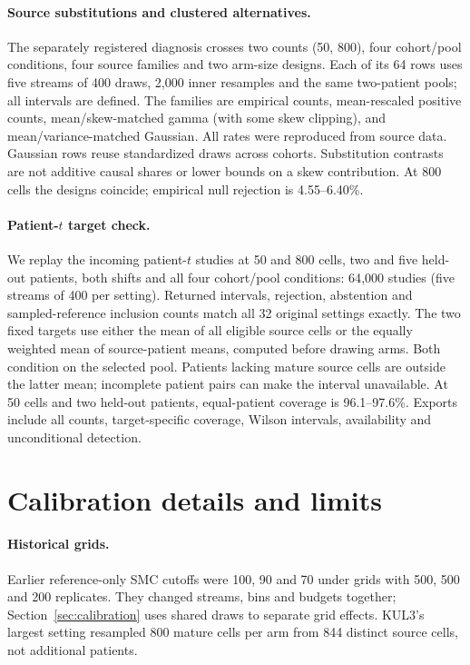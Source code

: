 \paragraph{Source substitutions and clustered alternatives.}\label{app:substitution}
The separately registered diagnosis crosses two counts (50, 800), four
cohort/pool conditions, four source families and two arm-size designs.
Each of its 64 rows uses five streams of 400 draws, 2{,}000 inner resamples
and the same two-patient pools; all intervals are defined. The families are
empirical counts, mean-rescaled positive counts, mean/skew-matched gamma
(with some skew clipping), and mean/variance-matched Gaussian. All rates
were reproduced from source data. Gaussian rows reuse standardized draws
across cohorts. Substitution contrasts are not additive causal shares or
lower bounds on a skew contribution. At 800 cells the designs coincide;
empirical null rejection is 4.55--6.40\%.

\paragraph{Patient-$t$ target check.}\label{app:patienttarget}
We replay the incoming patient-$t$ studies at 50 and 800 cells, two and five
held-out patients, both shifts and all four cohort/pool conditions: 64{,}000
studies (five streams of 400 per setting). Returned intervals, rejection,
abstention and sampled-reference inclusion counts match all 32 original
settings exactly. The two fixed targets use either the mean of all eligible
source cells or the equally weighted mean of source-patient means, computed
before drawing arms. Both condition on the selected pool. Patients lacking
mature source cells are outside the latter mean; incomplete patient pairs
can make the interval unavailable. At 50 cells and two held-out patients,
equal-patient coverage is 96.1--97.6\%. Exports include all counts, target-specific
coverage, Wilson intervals, availability and unconditional detection.

\section{Calibration details and limits}
\label{app:gridcaveats}

\paragraph{Historical grids.}\label{app:historical}
Earlier reference-only SMC cutoffs were 100, 90 and 70 under grids with
500, 500 and 200 replicates. They changed streams, bins and budgets together;
Section~\ref{sec:calibration} uses shared draws to separate grid effects.
KUL3's largest setting resampled 800 mature cells per arm from 844 distinct
source cells, not additional patients.

